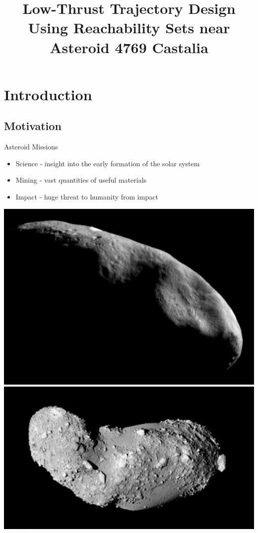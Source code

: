 \documentclass[11pt,professionalfonts]{beamer}
\title[Reachability Sets on \Poincare section]{\large\bf  Low-Thrust Trajectory Design Using Reachability Sets near Asteroid 4769 Castalia}
\author{\vspace*{-0.3cm}}
\institute{
	\footnotesize
	{\normalsize\bf{Shankar Kulumani and Taeyoung Lee}}\\
	\vspace*{0.2cm}
  	\textbf{Flight Dynamics \& Control Lab}\\ \vspace*{0.5cm}
 	\begin{figure} %
       	\texttt{[image: gw\_txh\_2cs\_pos]}
  	\end{figure}
}
\date{}
\begin{document}

\setcounter{framenumber}{-1}
\begin{frame} %
  \titlepage
\end{frame}   %

\section*{Introduction}
\subsection*{Motivation}  

\begin{frame}{Asteroid Missions}
\begin{itemize}
    \item Science - insight into the early formation of the solar system
    \item Mining - vast quantities of useful materials
    \item Impact - huge threat to humanity from impact
\end{itemize}    

\begin{center}
    \includegraphics[height=0.35\textheight]{figures/near_mos_20001203_full.jpg}
    \hfill
    \includegraphics[height=0.35\textheight]{figures/Itokawa8_hayabusa_1210.jpg}
\end{center}
\end{frame}
\end{document}
